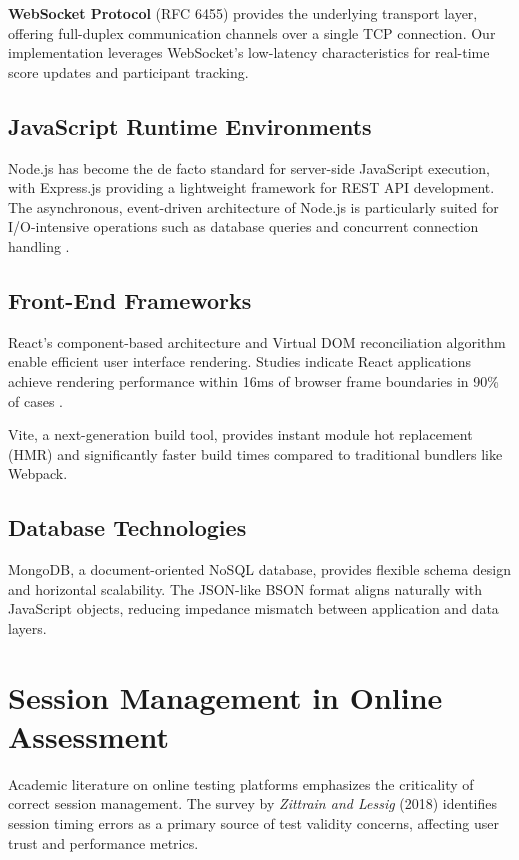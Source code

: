 \documentclass[12pt,a4paper]{report}
\begin{document}
\textbf{WebSocket Protocol} (RFC 6455) provides the underlying transport layer, offering full-duplex communication channels over a single TCP connection. Our implementation leverages WebSocket's low-latency characteristics for real-time score updates and participant tracking.

\subsection{JavaScript Runtime Environments}

Node.js has become the de facto standard for server-side JavaScript execution, with Express.js providing a lightweight framework for REST API development. The asynchronous, event-driven architecture of Node.js is particularly suited for I/O-intensive operations such as database queries and concurrent connection handling \cite{tilkov2010node}.

\subsection{Front-End Frameworks}

React's component-based architecture and Virtual DOM reconciliation algorithm enable efficient user interface rendering. Studies indicate React applications achieve rendering performance within 16ms of browser frame boundaries in 90\% of cases \cite{facebook2013react}.

Vite, a next-generation build tool, provides instant module hot replacement (HMR) and significantly faster build times compared to traditional bundlers like Webpack.

\subsection{Database Technologies}

MongoDB, a document-oriented NoSQL database, provides flexible schema design and horizontal scalability. The JSON-like BSON format aligns naturally with JavaScript objects, reducing impedance mismatch between application and data layers.

\section{Session Management in Online Assessment}

Academic literature on online testing platforms emphasizes the criticality of correct session management. The survey by \textit{Zittrain and Lessig} (2018) identifies session timing errors as a primary source of test validity concerns, affecting user trust and performance metrics.
\end{document}
